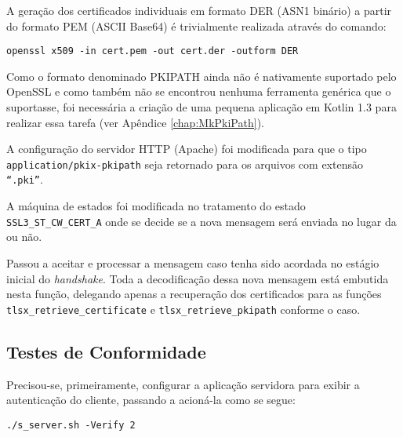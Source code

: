 A geração dos certificados individuais em formato \acs{DER} (\acs{ASN1} binário) a partir
do formato \acs{PEM} (ASCII Base64) é trivialmente realizada através do comando:

\begin{lstlisting}[caption={Conversão de certificados para o formato \acs{DER}}]
openssl x509 -in cert.pem -out cert.der -outform DER
\end{lstlisting}

Como o formato denominado PKIPATH ainda não é nativamente suportado
pelo OpenSSL e como também não se encontrou nenhuma ferramenta genérica
que o suportasse, foi necessária a criação de uma pequena aplicação em Kotlin 1.3
para realizar essa tarefa (ver Apêndice \vref{chap:MkPkiPath}).

A configuração do servidor \acs{HTTP} (Apache) foi modificada para que o tipo
\verb|application/pkix-pkipath| seja retornado para os arquivos com extensão
\texttt{``.pki''}.

\begin{description}[\breaklabel\setlabelstyle{\ttfamily}]

\item[s3\_clnt.c::ssl3\_connect]
	A máquina de estados foi modificada no tratamento do estado
	\verb|SSL3_ST_CW_CERT_A| onde se decide se a nova mensagem \tlsHsCu
	será enviada no lugar da \tlsHsC ou não.

\item[s3\_srvr.c::ssl3\_get\_client\_certificate]
	Passou a aceitar e processar a mensagem \tlsHsCu caso tenha sido
	acordada no estágio inicial do \emph{handshake}. Toda a decodificação dessa nova
	mensagem está embutida nesta função, delegando apenas a recuperação
	dos certificados para as funções \verb|tlsx_retrieve_certificate| e
	\verb|tlsx_retrieve_pkipath| conforme o caso.

\end{description}

\subsection{Testes de Conformidade}

Precisou-se, primeiramente, configurar a aplicação servidora para exibir a
autenticação do cliente, passando a acioná-la como se segue:

\begin{lstlisting}[caption={Chamada da \texttt{s\_server.sh} para forçar a autenticação do cliente}]
./s_server.sh -Verify 2
\end{lstlisting}

